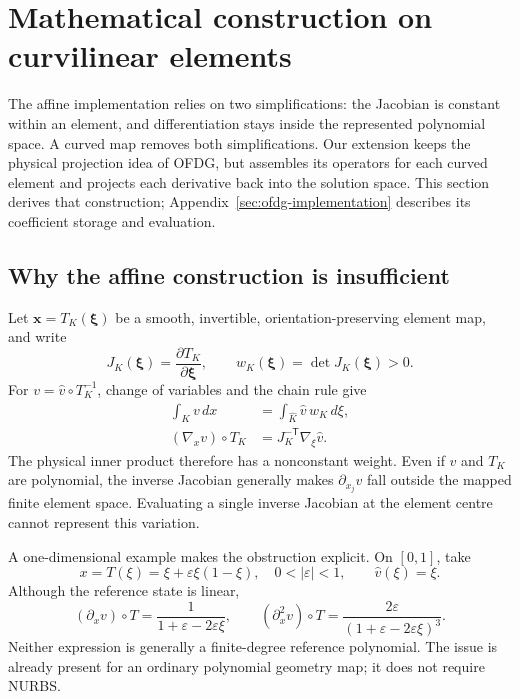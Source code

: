 \section{Mathematical construction on curvilinear elements}
\label{sec:curvilinear-mathematics}
The affine implementation relies on two simplifications: the Jacobian is
constant within an element, and differentiation stays inside the represented
polynomial space. A curved map removes both simplifications. Our extension
keeps the physical projection idea of OFDG, but assembles its operators for
each curved element and projects each derivative back into the solution space.
This section derives that construction; Appendix~\ref{sec:ofdg-implementation}
describes its coefficient storage and evaluation.

\subsection{Why the affine construction is insufficient}
Let $\boldsymbol x=T_K(\boldsymbol\xi)$ be a smooth, invertible,
orientation-preserving element map, and write
\begin{equation}
 J_K(\boldsymbol\xi)=\frac{\partial T_K}{\partial\boldsymbol\xi},
 \qquad w_K(\boldsymbol\xi)=\det J_K(\boldsymbol\xi)>0.
 \label{eq:curved-jacobian}
\end{equation}
For $v=\widehat v\circ T_K^{-1}$, change of variables and the chain rule give
\begin{align}
 \int_K v\,dx&=\int_{\widehat K}\widehat v\,w_K\,d\xi,
 \label{eq:curved-change-variables}\\
 (\nabla_xv)\circ T_K&=J_K^{-\mathsf T}\nabla_\xi\widehat v.
 \label{eq:curved-chain-rule}
\end{align}
The physical inner product therefore has a nonconstant weight. Even if
$\widehat v$ and $T_K$ are polynomial, the inverse Jacobian generally makes
$\partial_{x_j}v$ fall outside the mapped finite element space. Evaluating a
single inverse Jacobian at the element centre cannot represent this variation.

A one-dimensional example makes the obstruction explicit. On $[0,1]$, take
\begin{equation}
 x=T(\xi)=\xi+\varepsilon\xi(1-\xi),\quad
 0<|\varepsilon|<1,\qquad \widehat v(\xi)=\xi.
\end{equation}
Although the reference state is linear,
\begin{equation}
 (\partial_xv)\circ T=\frac{1}{1+\varepsilon-2\varepsilon\xi},\qquad
 (\partial_x^2v)\circ T=
 \frac{2\varepsilon}{(1+\varepsilon-2\varepsilon\xi)^3}.
 \label{eq:curved-derivative-example}
\end{equation}
Neither expression is generally a finite-degree reference polynomial. The
issue is already present for an ordinary polynomial geometry map; it does not
require NURBS.

